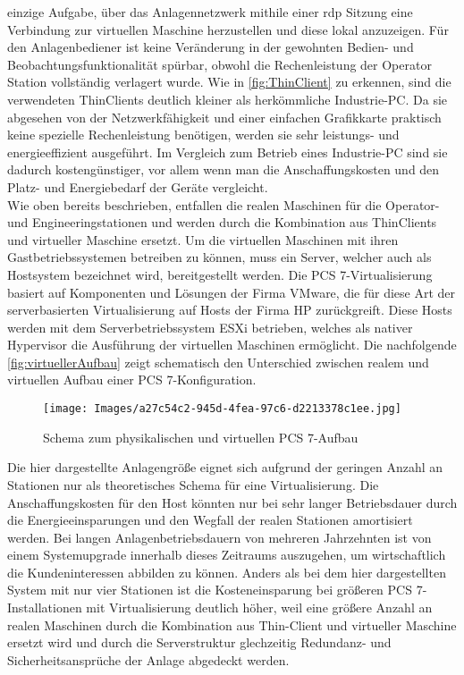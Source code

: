 einzige Aufgabe, über das Anlagennetzwerk mithile einer \acrfull{rdp} Sitzung eine Verbindung zur virtuellen Maschine herzustellen und diese lokal anzuzeigen. Für den Anlagenbediener ist keine Veränderung in der gewohnten Bedien- und Beobachtungsfunktionalität spürbar, obwohl die Rechenleistung der Operator Station vollständig verlagert wurde.  Wie in \autoref{fig:ThinClient} zu erkennen, sind die verwendeten ThinClients deutlich kleiner als herkömmliche Industrie-PC. Da sie abgesehen von der Netzwerkfähigkeit und einer einfachen Grafikkarte praktisch keine spezielle Rechenleistung benötigen, werden sie sehr leistungs- und energieeffizient ausgeführt. Im Vergleich zum Betrieb eines Industrie-PC sind sie dadurch kostengünstiger, vor allem wenn man die Anschaffungskosten und den Platz- und Energiebedarf der Geräte vergleicht.~\cite[S.~74]{SiemensAG2017}\medskip\\Wie oben bereits beschrieben, entfallen die realen Maschinen für die Operator- und Engineeringstationen und werden durch die Kombination aus ThinClients und virtueller Maschine ersetzt. Um die virtuellen Maschinen mit ihren Gastbetriebssystemen betreiben zu können, muss ein Server, welcher auch als Hostsystem bezeichnet wird, bereitgestellt werden. Die PCS 7-Virtualisierung basiert auf Komponenten und Lösungen der Firma VMware, die für diese Art der serverbasierten Virtualisierung auf Hosts der Firma HP zurückgreift. Diese Hosts werden mit dem Serverbetriebssystem ESXi betrieben, welches als nativer Hypervisor die Ausführung der virtuellen Maschinen ermöglicht. Die nachfolgende \autoref{fig:virtuellerAufbau} zeigt schematisch den Unterschied zwischen realem und virtuellen Aufbau einer PCS 7-Konfiguration.
\begin{figure}[H]
    \centering
    \texttt{[image: Images/a27c54c2-945d-4fea-97c6-d2213378c1ee.jpg]}\caption[Schema zum physikalischen und virtuellen PCS 7-Aufbau]{Schema zum physikalischen und virtuellen PCS 7-Aufbau \cite[S.~10]{SiemensIndustryOnlineSupport2018}}
    \label{fig:virtuellerAufbau}
\end{figure}
Die hier dargestellte Anlagengröße eignet sich aufgrund der geringen Anzahl an Stationen nur als theoretisches Schema für eine Virtualisierung. Die Anschaffungskosten für den Host könnten nur bei sehr langer Betriebsdauer durch die Energieeinsparungen und den Wegfall der realen Stationen amortisiert werden. Bei langen Anlagenbetriebsdauern von mehreren Jahrzehnten ist von einem Systemupgrade innerhalb dieses Zeitraums auszugehen, um wirtschaftlich die Kundeninteressen abbilden zu können. Anders als bei dem hier dargestellten System mit nur vier Stationen ist die Kosteneinsparung bei größeren PCS 7-Installationen mit Virtualisierung deutlich höher, weil eine größere Anzahl an realen Maschinen durch die Kombination aus Thin-Client und virtueller Maschine ersetzt wird und durch die Serverstruktur glechzeitig Redundanz- und Sicherheitsansprüche der Anlage abgedeckt werden.
